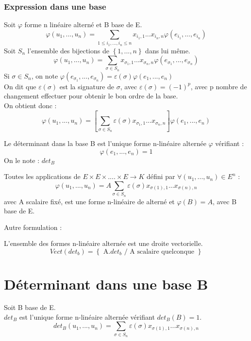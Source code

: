 \subsubsection{Expression dans une base}
Soit $\varphi$ forme n linéaire alterné et B base de E.
$$\varphi(u_1,...,u_n) = \sum_{1 \leq i_1,...,i_n \leq n} x_{i_1,1}...x_{i_n,n}\varphi(e_{i_1},...,e_{i_n})$$ 
Soit $S_n$ l'ensemble des bijections de $\left\lbrace 1,...,n \right\rbrace$ dans lui même. 
$$\varphi(u_1,...,u_n) = \sum_{\sigma \in S_n} x_{\sigma_1,1}...x_{\sigma_n,n}\varphi(e_{\sigma_1},...,e_{\sigma_n})$$ 
Si $\sigma \in S_n$, on note $\varphi(e_{\sigma_1},...,e_{\sigma_n}) = \varepsilon(\sigma)\varphi(e_{1},...,e_{n})$\\
On dit que $\varepsilon(\sigma)$ est la signature de $\sigma$, avec $\varepsilon(\sigma) = (-1)^p$, avec p nombre de changement effectuer pour obtenir le bon ordre de la base.\\
On obtient donc :
$$\varphi(u_1,...,u_n) = \left[ \sum_{\sigma \in S_n} \varepsilon(\sigma)x_{\sigma_1,1}...x_{\sigma_n,n}\right]\varphi(e_1,...,e_n) $$
\begin{de}
 Le déterminant dans la base B est l'unique forme n-linéaire alternée $\varphi$ vérifiant :
$$ \varphi(e_1,...,e_n) = 1$$
On le note : $det_B$
\end{de}
\begin{prop}
Toutes les applications de $E\times E\times .... \times E \rightarrow K$ défini par $\forall(u_1,...,u_n) \in E^n$ : 
$$\varphi(u_1,...,u_n) = A\sum_{\sigma \in S_n}\varepsilon(\sigma)x_{\sigma(1),1}...x_{\sigma(n),n}$$
avec A scalaire fixé, est une forme n-linéaire de alterné et $\varphi(B)=A$, avec B base de E.
\end{prop}
Autre formulation : 
\begin{prop}
L'ensemble des formes n-linéaire alternée est une droite vectorielle.
$$Vect(det_b) = \left\lbrace \mbox{ A.}det_b\mbox{ / A scalaire quelconque } \right\rbrace $$ 
\end{prop}
\section{Déterminant dans une base B}
\begin{de}
Soit B base de E.\\
$det_B$ est l'unique forme n-linéaire alternée vérifiant $det_B(B)=1$.
$$det_B(u_1,...,u_n) = \sum_{\sigma \in S_n} \varepsilon(\sigma)x_{\sigma(1),1}...x_{\sigma(n),n}$$
\end{de}
